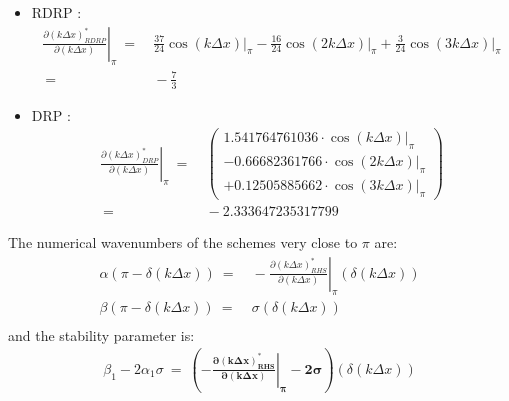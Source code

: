 \documentclass[conf]{new-aiaa}
\begin{document}
{{\begin{itemize}
\begin{equation*}
		\end{equation*}
	\item RDRP \cite{RDRP}:
		\begin{equation*}
			\begin{split}
  			\left.\frac{\partial\left({k\Delta{x}}\right)^*_{RDRP}}{\partial\left({k\Delta{x}}\right)}\right|_{\pi}~=&~\frac{37}{24}\left.\cos\left({k\Delta{x}}\right)\right|_{\pi}-\frac{16}{24}\left.\cos\left(2{k\Delta{x}}\right)\right|_{\pi}+\frac{3}{24}\left.\cos\left(3{k\Delta{x}}\right)\right|_{\pi} \\
  			~=&~-\frac{7}{3} 
				\end{split}
		\end{equation*}
	\item DRP \cite{DRP}:
		\begin{equation*}
			\begin{split}
  			\left.\frac{\partial\left({k\Delta{x}}\right)^*_{DRP}}{\partial\left({k\Delta{x}}\right)}\right|_{\pi}~=&~
  			\left(
  			\begin{matrix}
  			1.541764761036\cdot\left.\cos\left({k\Delta{x}}\right)\right|_{\pi} \\
  			-0.66682361766\cdot\left.\cos\left(2{k\Delta{x}}\right)\right|_{\pi} \\
  			+0.12505885662\cdot\left.\cos\left(3{k\Delta{x}}\right)\right|_{\pi}
  			\end{matrix}
  			\right) \\
  			~=&~-2.333647235317799
				\end{split}
		\end{equation*}
\end{itemize}
The numerical wavenumbers of the schemes very close to $\pi$ are:
\begin{equation}
	\begin{split}
		\label{eq:}
  			\alpha\left(\pi-\delta\left(k\Delta{x}\right)\right)~=&~ -\left.\frac{\partial\left({k\Delta{x}}\right)^*_{RHS}}{\partial\left({k\Delta{x}}\right)}\right|_{\pi}\left(\delta\left({k\Delta{x}}\right)\right) \\
  			\beta\left(\pi-\delta\left(k\Delta{x}\right)\right)~=&~ \sigma\left(\delta\left({k\Delta{x}}\right)\right) \\
	\end{split}
\end{equation}
and the stability parameter is:
\begin{equation}
	\begin{split}
		\label{eq:}\beta_1-2\alpha_1\sigma~=~\boldsymbol{\left(-\left.\frac{\partial\left({k\Delta{x}}\right)^*_{RHS}}{\partial\left({k\Delta{x}}\right)}\right|_{\pi}-2\sigma\right)} \left(\delta\left({k\Delta{x}}\right)\right)  			

\end{split}
\end{equation}}}
\end{document}
